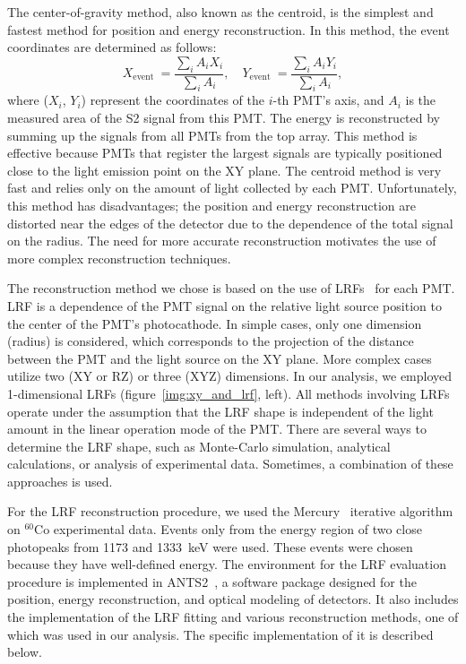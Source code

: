 \documentclass[a4paper,11pt]{article}
\begin{document}
The center-of-gravity method, also known as the centroid, is the simplest and fastest method for position and energy reconstruction. In this method, the event coordinates are determined as follows:
\begin{equation}
X_{\text {event }}=\frac{\sum_i A_i X_i}{\sum_i A_i}, \quad Y_{\text {event }}=\frac{\sum_i A_i Y_i}{\sum_i A_i},
\end{equation}
where ($X_i$, $Y_i$) represent the coordinates of the $i$-th PMT's axis, and $A_i$ is the measured area of the S2 signal from this PMT.
The energy is reconstructed by summing up the signals from all PMTs from the top array.
This method is effective because PMTs that register the largest signals are typically positioned close to the light emission point on the XY plane.
The centroid method is very fast and relies only on the amount of light collected by each PMT.
Unfortunately, this method has disadvantages; the position and energy reconstruction are distorted near the edges of the detector due to the dependence of the total signal on the radius.
The need for more accurate reconstruction motivates the use of more complex reconstruction techniques.

The reconstruction method we chose is based on the use of LRFs~\cite{Solovov2012} for each PMT.
LRF is a dependence of the PMT signal on the relative light source position to the center of the PMT's photocathode.
In simple cases, only one dimension (radius) is considered, which corresponds to the projection of the distance between the PMT and the light source on the XY plane. 
More complex cases utilize two (XY or RZ) or three (XYZ) dimensions. 
In our analysis, we employed 1-dimensional LRFs (figure~\ref{img:xy_and_lrf}, left).
All methods involving LRFs operate under the assumption that the LRF shape is independent of the light amount in the linear operation mode of the PMT. 
There are several ways to determine the LRF shape, such as Monte-Carlo simulation, analytical calculations, or analysis of experimental data. Sometimes, a combination of these approaches is used.

For the LRF reconstruction procedure, we used the Mercury~\cite{Solovov2012} iterative algorithm on $^{60}$Co experimental data. 
Events only from the energy region of two close photopeaks from 1173 and 1333~keV were used. 
These events were chosen because they have well-defined energy. 
The environment for the LRF evaluation procedure is implemented in ANTS2~\cite{Morozov_2016}, a software package designed for the position, energy reconstruction, and optical modeling of detectors. 
It also includes the implementation of the LRF fitting and various reconstruction methods, one of which was used in our analysis. The specific implementation of it is described below.
\end{document}

